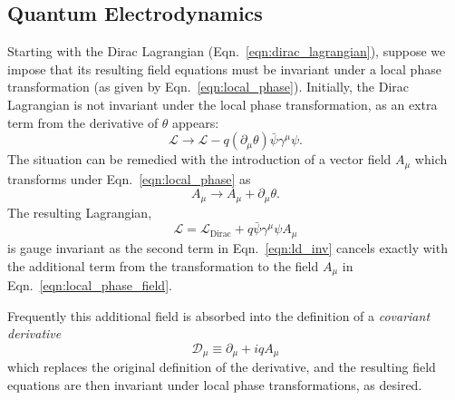 \subsection{Quantum Electrodynamics} \label{sec:theory_qed}
Starting with the Dirac Lagrangian (Eqn.~\ref{eqn:dirac_lagrangian}), suppose we impose that its resulting field equations must be invariant under a local phase transformation (as given by Eqn.~\ref{eqn:local_phase}).
Initially, the Dirac Lagrangian is not invariant under the local phase transformation, as an extra term from the derivative of $\theta$ appears:
\begin{equation} \label{eqn:ld_var}
    \mathcal L \to \mathcal L - q (\partial_\mu \theta)\bar{\psi} \gamma^\mu \psi.
\end{equation}
The situation can be remedied with the introduction of a vector field $A_\mu$ which transforms under Eqn.~\ref{eqn:local_phase} as
\begin{equation} \label{eqn:local_phase_field}
    A_\mu \to A_\mu + \partial_\mu \theta.
\end{equation}
The resulting Lagrangian,
\begin{equation} \label{eqn:ld_inv}
    \mathcal L = \mathcal L_{\text{Dirac}} + q \bar{\psi} \gamma^\mu \psi A_\mu
\end{equation}
is gauge invariant as the second term in Eqn.~\ref{eqn:ld_inv} cancels exactly with the additional term from the transformation to the field $A_\mu$ in Eqn.~\ref{eqn:local_phase_field}.

Frequently this additional field is absorbed into the definition of a \emph{covariant derivative} 
\begin{equation}
    \mathcal D_\mu \equiv \partial_\mu + i q A_\mu
\end{equation}
which replaces the original definition of the derivative, and the resulting field equations are then invariant under local phase transformations, as desired.

